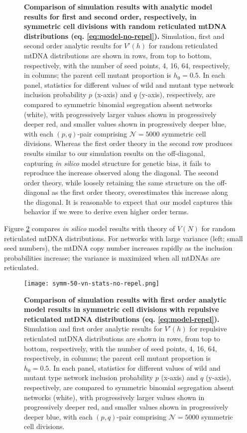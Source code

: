 \documentclass{article}
\begin{document}
\begin{appendices}
\begin{figure}[!ht]
        \caption{\textbf{Comparison of simulation results with analytic model results for first and second order, respectively, in symmetric cell divisions with         random reticulated mtDNA distributions (eq. \ref{eq:model-no-repel}).} Simulation, first and second order analytic results for $V'(h)$ for random reticulated mtDNA distributions are shown in rows, from top to bottom, respectively, with the number of seed points, 4, 16, 64, respectively, in columns; the parent cell mutant proportion is $h_0=0.5$. In each panel, statistics for different values of wild and mutant type network inclusion probability $p$ (x-axis) and $q$ (y-axis), respectively, are compared to symmetric binomial segregation absent networks (white), with progressively larger values shown in progressively deeper red, and smaller values shown in progressively deeper blue, with each $(p,q)$-pair comprising $\mathcal{N}=5000$ symmetric cell divisions. Whereas the first order theory in the second row produces results similar to our simulation results on the off-diagonal, capturing \textit{in silico} model structure for genetic bias, it fails to reproduce the increase observed along the diagonal. The second order theory, while loosely retaining the same structure on the off-diagonal as the first order theory, overestimates this increase along the diagonal. It is reasonable to expect that our model captures this behavior if we were to derive even higher order terms.}\label{fig:app-vh-stats-no-repel}
\end{figure}
Figure \ref{fig:app-vn-stats-no-repel} compares \textit{in silico} model results with theory of $V(N)$ for random reticulated mtDNA distributions. For networks with large variance (left; small seed numbers), the mtDNA copy number increases rapidly as the inclusion probabilities increase; the variance is maximized when all mtDNAs are reticulated.
\begin{figure}[!ht]
        \centering \texttt{[image: symm-50-vn-stats-no-repel.png]}
        \caption{\textbf{Comparison of simulation results with first order analytic model results in symmetric cell divisions with repulsive reticulated mtDNA distributions (eq. \ref{eq:model-repel}).} Simulation and first order analytic results for $V'(h)$ for repulsive reticulated mtDNA distributions are shown in rows, from top to bottom, respectively, with the number of seed points, 4, 16, 64, respectively, in columns; the parent cell mutant proportion is $h_0=0.5$. In each panel, statistics for different values of wild and mutant type network inclusion probability $p$ (x-axis) and $q$ (y-axis), respectively, are compared to symmetric binomial segregation absent networks (white), with progressively larger values shown in progressively deeper red, and smaller values shown in progressively deeper blue, with each $(p,q)$-pair comprising $\mathcal{N}=5000$ symmetric cell divisions.}\label{fig:app-vn-stats-no-repel}

\end{figure}
\end{appendices}
\end{document}
